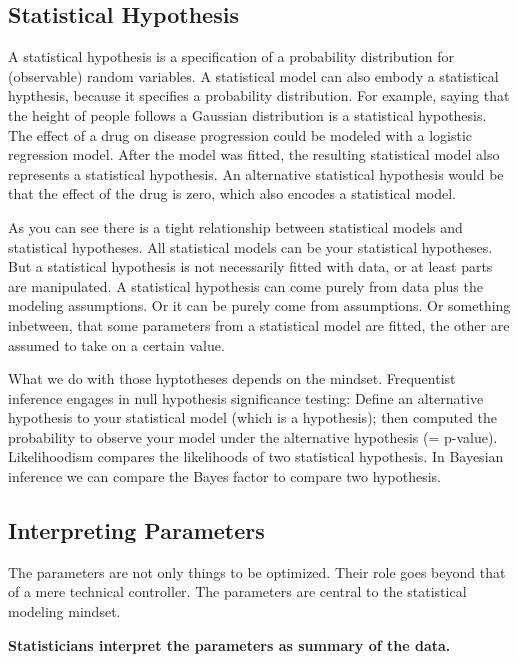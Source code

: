 \documentclass[
  10pt,
]{scrbook}
\begin{document}
\hypertarget{statistical-hypothesis}{%
\subsection*{Statistical Hypothesis}\label{statistical-hypothesis}}


A statistical hypothesis is a specification of a probability distribution for (observable) random variables.
A statistical model can also embody a statistical hypthesis, because it specifies a probability distribution.
For example, saying that the height of people follows a Gaussian distribution is a statistical hypothesis.
The effect of a drug on disease progression could be modeled with a logistic regression model.
After the model was fitted, the resulting statistical model also represents a statistical hypothesis.
An alternative statistical hypothesis would be that the effect of the drug is zero, which also encodes a statistical model.

As you can see there is a tight relationship between statistical models and statistical hypotheses.
All statistical models can be your statistical hypotheses.
But a statistical hypothesis is not necessarily fitted with data, or at least parts are manipulated.
A statistical hypothesis can come purely from data plus the modeling assumptions.
Or it can be purely come from assumptions.
Or something inbetween, that some parameters from a statistical model are fitted, the other are assumed to take on a certain value.

What we do with those hyptotheses depends on the mindset.
Frequentist inference engages in null hypothesis significance testing: Define an alternative hypothesis to your statistical model (which is a hypothesis); then computed the probability to observe your model under the alternative hypothesis (= p-value).
Likelihoodism compares the likelihoods of two statistical hypothesis.
In Bayesian inference we can compare the Bayes factor to compare two hypothesis.

\hypertarget{interpreting-parameters}{%
\subsection*{Interpreting Parameters}\label{interpreting-parameters}}


The parameters are not only things to be optimized.
Their role goes beyond that of a mere technical controller.
The parameters are central to the statistical modeling mindset.

\textbf{Statisticians interpret the parameters as summary of the data.}
\end{document}
